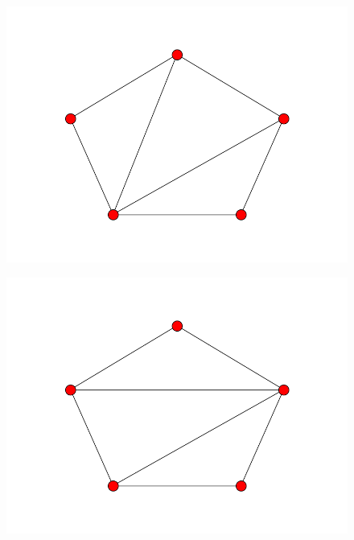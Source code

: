 \documentclass[fontsize=10pt]{article}
\begin{document}
\begin{figure}[hbtp]
\centering
\includegraphics[scale=0.5]{imgs/pentagon/pentagon_3.png}
\end{figure}

\begin{figure}[hbtp]
\centering
\includegraphics[scale=0.5]{imgs/pentagon/pentagon_4.png}
\end{figure}
\end{document}
